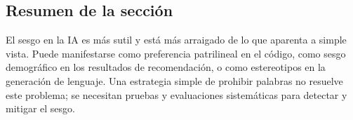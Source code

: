 \subsection{Resumen de la sección}

El sesgo en la IA es más sutil y está más arraigado de lo que aparenta a simple vista. Puede manifestarse como preferencia patrilineal en el código, como sesgo demográfico en los resultados de recomendación, o como estereotipos en la generación de lenguaje. Una estrategia simple de prohibir palabras no resuelve este problema; se necesitan pruebas y evaluaciones sistemáticas para detectar y mitigar el sesgo.

